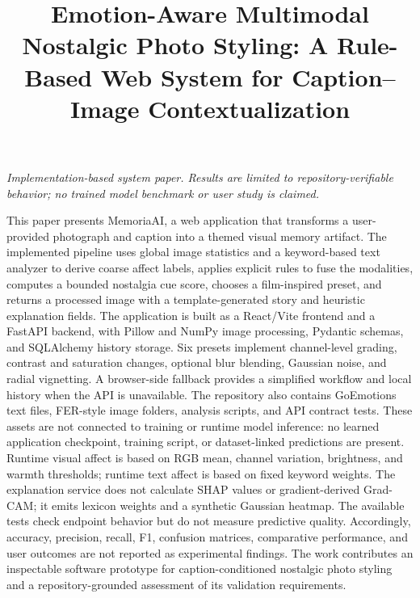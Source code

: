 \documentclass[conference]{IEEEtran}
\title{Emotion-Aware Multimodal Nostalgic Photo Styling: A Rule-Based Web System for Caption--Image Contextualization}
\author{\IEEEauthorblockN{Oviya Ragothamana, Sushma Pokala, Sammangi Gopi Chand, Raghu Paladi}
\IEEEauthorblockA{School of Computer Science and Engineering (SCOPE), Vellore Institute of Technology (VIT), Vellore, India\\Trainees, LTIMindtree\\Corresponding author: [Email]}}
\begin{document}
\maketitle
\begin{center}\textit{Implementation-based system paper. Results are limited to repository-verifiable behavior; no trained model benchmark or user study is claimed.}\end{center}
\markdownRendererDocumentBegin
\markdownRendererSectionBegin
\markdownRendererSectionBegin
{}\markdownRendererInterblockSeparator
{}This paper presents MemoriaAI, a web application that transforms a user-provided photograph and caption into a themed visual memory artifact. The implemented pipeline uses global image statistics and a keyword-based text analyzer to derive coarse affect labels, applies explicit rules to fuse the modalities, computes a bounded nostalgia cue score, chooses a film-inspired preset, and returns a processed image with a template-generated story and heuristic explanation fields. The application is built as a React/Vite frontend and a FastAPI backend, with Pillow and NumPy image processing, Pydantic schemas, and SQLAlchemy history storage. Six presets implement channel-level grading, contrast and saturation changes, optional blur blending, Gaussian noise, and radial vignetting. A browser-side fallback provides a simplified workflow and local history when the API is unavailable.\markdownRendererParagraphSeparator
{}The repository also contains GoEmotions text files, FER-style image folders, analysis scripts, and API contract tests. These assets are not connected to training or runtime model inference: no learned application checkpoint, training script, or dataset-linked predictions are present. Runtime visual affect is based on RGB mean, channel variation, brightness, and warmth thresholds; runtime text affect is based on fixed keyword weights. The explanation service does not calculate SHAP values or gradient-derived Grad-CAM; it emits lexicon weights and a synthetic Gaussian heatmap. The available tests check endpoint behavior but do not measure predictive quality. Accordingly, accuracy, precision, recall, F1, confusion matrices, comparative performance, and user outcomes are not reported as experimental findings. The work contributes an inspectable software prototype for caption-conditioned nostalgic photo styling and a repository-grounded assessment of its validation requirements.\markdownRendererInterblockSeparator
{}
\markdownRendererSectionEnd \markdownRendererSectionBegin
\end{document}
